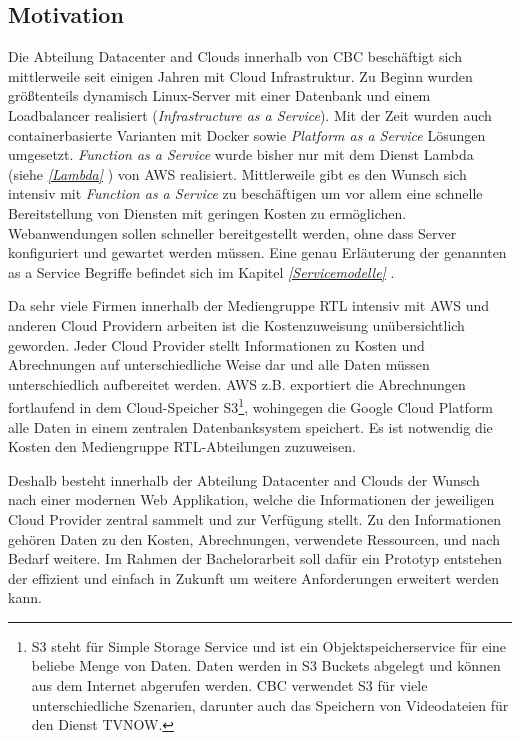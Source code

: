 \subsection{Motivation}
\label{Motivation}
Die Abteilung Datacenter and Clouds innerhalb von CBC beschäftigt sich mittlerweile seit einigen Jahren mit Cloud Infrastruktur.
Zu Beginn wurden größtenteils dynamisch Linux-Server mit einer Datenbank und einem Loadbalancer realisiert (\textsl{Infrastructure as a Service}).
Mit der Zeit wurden auch containerbasierte Varianten mit Docker sowie \textsl{Platform as a Service} Lösungen umgesetzt.
\textsl{Function as a Service} wurde bisher nur mit dem Dienst Lambda (siehe \textit{\ref{Lambda} }) von AWS realisiert.
Mittlerweile gibt es den Wunsch sich intensiv mit \textsl{Function as a Service} zu beschäftigen um vor allem eine schnelle Bereitstellung von Diensten mit geringen Kosten zu ermöglichen.
Webanwendungen sollen schneller bereitgestellt werden, ohne dass Server konfiguriert und gewartet werden müssen.
Eine genau Erläuterung der genannten \glqq [...] as a Service\grqq{} Begriffe befindet sich im Kapitel \textit{\ref{Servicemodelle} }.

Da sehr viele Firmen innerhalb der Mediengruppe RTL intensiv mit AWS und anderen Cloud Providern arbeiten ist die Kostenzuweisung unübersichtlich geworden.
Jeder Cloud Provider stellt Informationen zu Kosten und Abrechnungen auf unterschiedliche Weise dar und alle Daten müssen unterschiedlich aufbereitet werden.
AWS z.B. exportiert die Abrechnungen fortlaufend in dem Cloud-Speicher
S3\footnote{S3 steht für Simple Storage Service und ist ein Objektspeicherservice für eine beliebe Menge von Daten.
Daten werden in S3 Buckets abgelegt und können aus dem Internet abgerufen werden.
CBC verwendet S3 für viele unterschiedliche Szenarien, darunter auch das Speichern von Videodateien für den Dienst TVNOW.}, wohingegen die Google Cloud Platform alle Daten in einem zentralen Datenbanksystem speichert.
Es ist notwendig die Kosten den Mediengruppe RTL-Abteilungen zuzuweisen.

Deshalb besteht innerhalb der Abteilung Datacenter and Clouds der Wunsch nach einer modernen Web Applikation, welche die Informationen der jeweiligen Cloud Provider zentral sammelt und zur Verfügung stellt.
Zu den Informationen gehören Daten zu den Kosten, Abrechnungen, verwendete Ressourcen, und nach Bedarf weitere.
Im Rahmen der Bachelorarbeit soll dafür ein Prototyp entstehen der effizient und einfach in Zukunft um weitere Anforderungen erweitert werden kann.
